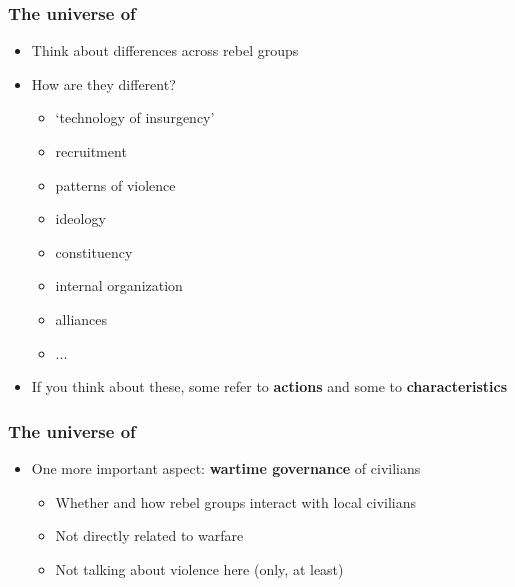 \documentclass[aspectratio=43]{beamer}
\begin{document}
\begin{frame}
\frametitle{The universe of }
\centering

\begin{itemize}
  \item Think about differences across rebel groups
  \item How are they different?
  \begin{itemize}
    \item<2-> `technology of insurgency'
    \item<3-> recruitment
    \item<4-> patterns of violence
    \item<5-> ideology
    \item<6-> constituency
    \item<7-> internal organization
    \item<8-> alliances
    \item<8-> ...
  \end{itemize}
  \item<9-> If you think about these, some refer to \textbf{actions} and some to \textbf{characteristics}
\end{itemize}

\end{frame}


\begin{frame}
\frametitle{The universe of }
\centering

\begin{itemize}
  \item One more important aspect: \textbf{wartime governance} of civilians
  \begin{itemize}
    \item<2-> Whether and how rebel groups interact with local civilians
    \item<3-> Not directly related to warfare
    \item<4-> Not talking about violence here (only, at least)
  \end{itemize}
\end{itemize}

\end{frame}
\end{document}
